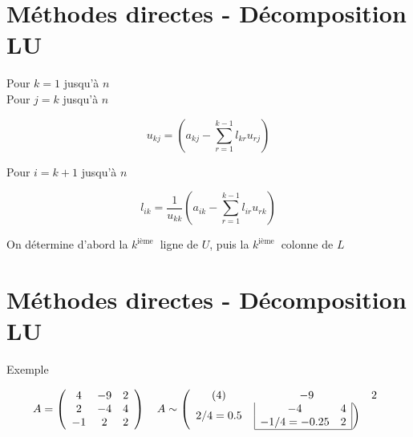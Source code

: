 \documentclass[10pt]{article}
\begin{document}
\section*{Méthodes directes - Décomposition LU}
Pour \(k=1\) jusqu'à \(n\)\\
Pour \(j=k\) jusqu'à \(n\)

\[
u_{k j}=\left(a_{k j}-\sum_{r=1}^{k-1} l_{k r} u_{r j}\right)
\]

Pour \(i=k+1\) jusqu'à \(n\)

\[
l_{i k}=\frac{1}{u_{k k}}\left(a_{i k}-\sum_{r=1}^{k-1} l_{i r} u_{r k}\right)
\]

On détermine d'abord la \(k^{\text {ième }}\) ligne de \(U\), puis la \(k^{\text {ième }}\) colonne de \(L\)

\section*{Méthodes directes - Décomposition LU}
Exemple

\[
A=\left(\begin{array}{ccc}
4 & -9 & 2 \\
2 & -4 & 4 \\
-1 & 2 & 2
\end{array}\right) \quad A \sim\left(\begin{array}{ccc}
(4) & -9 & 2 \\
2 / 4=0.5 & \left.\begin{array}{|cc|}
-4 & 4 \\
-1 / 4=-0.25 & 2 \\
\hline
\end{array}\right)
\end{array}\right.
\]
\end{document}
